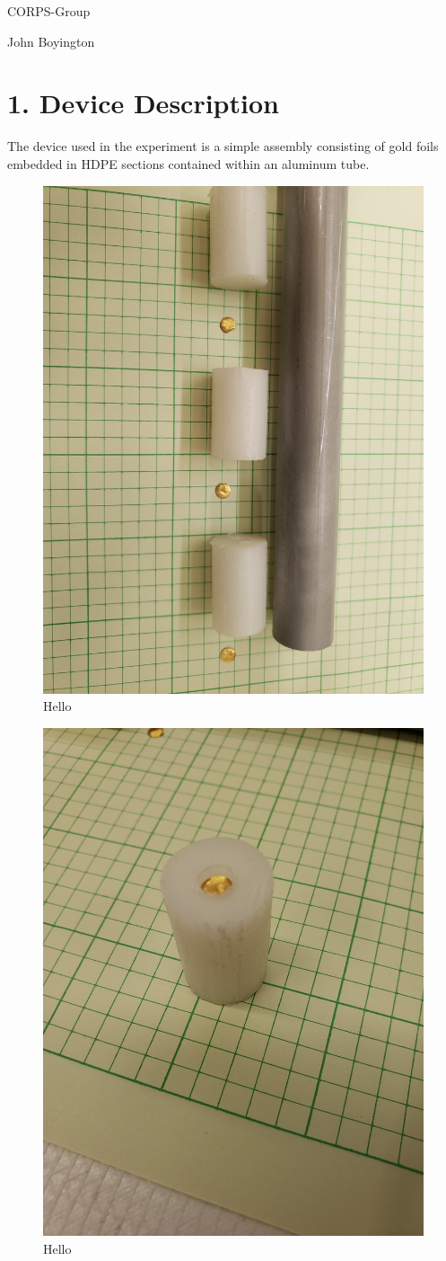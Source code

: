 \documentclass{amsart}
\theoremstyle{definition}
\begin{document}
\LARGE{CORPS-Group}
 
\large
John Boyington
\newline
\bigskip


\section*{1. Device Description}
\bigskip

The device used in the experiment is a simple assembly consisting of gold foils embedded in HDPE sections contained within an aluminum tube.

\begin{figure}[h!]
\includegraphics[width=0.6\linewidth]{img/exploded.jpg}
\caption{Hello}
\end{figure}

\begin{figure}[h!]
\includegraphics[width=0.6\linewidth]{img/section0.jpg}
\caption{Hello}
\end{figure}
\end{document}
